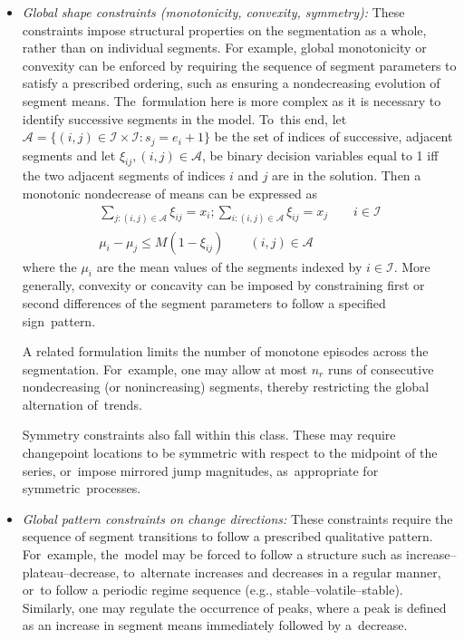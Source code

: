 \documentclass[mathematics,article,accept,pdftex,moreauthors]{Definitions/mdpi}
\begin{document}
\begin{itemize}
	\item {\it Global shape constraints (monotonicity, convexity, symmetry):}
	These constraints impose structural properties on the segmentation as a whole, rather than on individual segments.
	For example, global monotonicity or convexity can be enforced by requiring the sequence of segment parameters to satisfy a prescribed ordering, such as ensuring a nondecreasing evolution of segment means. The~formulation here is more complex as it is necessary to identify successive segments in the model. To~this end, let $\mathcal{A} = \{(i,j) \in \mathcal{I} \times \mathcal{I} : s_j = e_i+1 \}$ be the set of indices of successive, adjacent segments and let $\xi_{ij}, (i,j) \in \mathcal{A}$, be binary decision variables equal to 1 iff the two adjacent segments of indices $i$ and $j$ are in the solution. Then a monotonic nondecrease of means can be expressed as
	\vspace{-2pt}
\begin{equation}
		\begin{split}
			\sum_{j:(i,j)\in \mathcal{A}} \xi_{ij} = x_i; 
			\sum_{i:(i,j)\in \mathcal{A}} \xi_{ij} = x_j \qquad i \in \mathcal{I} \\
			\mu_i - \mu_j \leq M(1-\xi_{ij}) \qquad (i,j) \in \mathcal{A}
		\end{split}
	\end{equation}
	where the $\mu_i$ are the mean values of the segments indexed by $i \in \mathcal{I}$. More generally, convexity or concavity can be imposed by constraining first or second differences of the segment parameters to follow a specified sign~pattern.
	
	A related formulation limits the number of monotone episodes across the segmentation. For~example, one may allow at most $n_r$ runs of consecutive nondecreasing (or nonincreasing) segments, thereby restricting the global alternation of~trends.
	
	Symmetry constraints also fall within this class. These may require changepoint locations to be symmetric with respect to the midpoint of the series, or~impose mirrored jump magnitudes, as~appropriate for symmetric~processes.
	
	\item {\it Global pattern constraints on change directions:}
	These constraints require the sequence of segment transitions to follow a prescribed qualitative pattern. For~example, the~model may be forced to follow a structure such as increase–plateau–decrease, to~alternate increases and decreases in a regular manner, or~to follow a periodic regime sequence (e.g., stable–volatile–stable). Similarly, one may regulate the occurrence of peaks, where a peak is defined as an increase in segment means immediately followed by a~decrease.
	

\end{itemize}
\end{document}
